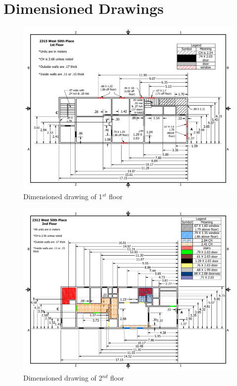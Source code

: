 \documentclass[11pt,oneside]{book}
\begin{document}


\appendix

\chapter{Dimensioned Drawings}

\begin{figure}[h!]
\centering
\includegraphics[width=.80\textwidth]{../Figures/50th_Place_1st_Floor}
\caption {Dimensioned drawing of 1$^{st}$ floor}
\label{fig:first_floor}
\end{figure}

\begin{figure}[h!]
\centering
\includegraphics[width=.80\textwidth]{../Figures/50th_Place_2nd_Floor}
\caption {Dimensioned drawing of 2$^{nd}$ floor}
\label{fig:second_floor}
\end{figure}
\end{document}
